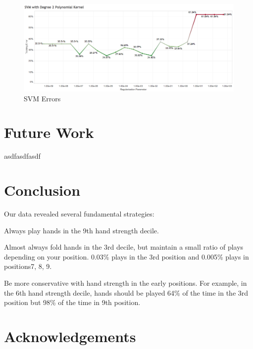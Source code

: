 \documentclass[twoside]{article}
\begin{document}
\begin{multicols}{2}
\begin{figure}[H]
  \centering
  \centerline{\includegraphics[width=1\columnwidth]{SVM.png}}
   \caption{SVM Errors}
  \label{fig:SVM}
\end{figure}


\section{Future Work}

asdfasdfasdf


\section{Conclusion}

Our data revealed several fundamental strategies:
\begin{compactitem}
\item{} Always play hands in the 9th hand strength decile. 
\item{} Almost always fold hands in the 3rd decile, but maintain a small ratio of plays depending on your position. 0.03\% plays in the 3rd position and 0.005\% plays in positions7, 8, 9. 
\item{}Be more conservative with hand strength in the early positions. For example, in the 6th hand strength decile, hands should be played 64\% of the time in the 3rd position but 98\% of the time in 9th position.
\end{compactitem}



\section{Acknowledgements}


\end{multicols}
\end{document}
